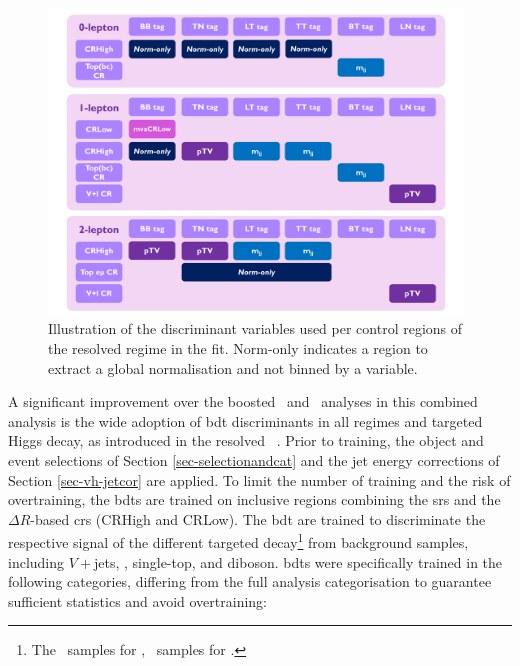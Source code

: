 \begin{figure}[h!]
  \center
  \includegraphics[width=0.98\textwidth]{Images/VH/Discriminants/Variables.pdf}
  \caption{Illustration of the discriminant variables used per control regions of the resolved regime in the fit. Norm-only indicates a region to extract a global normalisation and not binned by a variable.} %
  \label{fig:variablesControlReg}
\end{figure}

A significant improvement over the boosted \vhb\ and \vhc\ analyses in this combined analysis is the wide adoption of \gls{bdt} discriminants in all regimes and targeted Higgs decay, as introduced in the resolved \vhb\ \cite{ATLAS:2020fcp}. Prior to training, the object and event selections of Section \ref{sec-selectionandcat} and the jet energy corrections of Section \ref{sec-vh-jetcor} are applied. To limit the number of training and the risk of overtraining, the \gls{bdt}s are trained on inclusive regions combining the \gls{sr}s and the $\Delta R$-based \gls{cr}s (CRHigh and CRLow). The \gls{bdt} are trained to discriminate the respective signal of the different targeted decay\footnote{The \vhb\ samples for \vhb, \vhc\ samples for \vhc.} from background samples, including $V+$jets, \ttb, single-top, and diboson. \gls{bdt}s were specifically trained in the following categories, differing from the full analysis categorisation to guarantee sufficient statistics and avoid overtraining:


